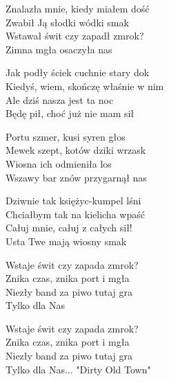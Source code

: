 \begin{text}
    Znalazła mnie, kiedy miałem dość\\
    Zwabił Ją słodki wódki smak\\
    Wstawał świt czy zapadł zmrok?\\
    Zimna mgła osaczyła nas

    Jak podły ściek cuchnie stary dok\\
    Kiedyś, wiem, skończę właśnie w nim\\
    Ale dziś nasza jest ta noc\\
    Będę pił, choć już nie mam sił

    Portu szmer, kusi syren głos\\
    Mewek szept, kotów dziki wrzask\\
    Wiosna ich odmieniła los\\
    Wszawy bar znów przygarnął nas

    \vin Dziwnie tak księżyc-kumpel lśni\\
    \vin Chciałbym tak na kielicha wpaść\\
    \vin Całuj mnie, całuj z całych sił!\\
    \vin Usta Twe mają wiosny smak

    Wstaje świt czy zapada zmrok?\\
    Znika czas, znika port i mgła\\
    Niezły band za piwo tutaj gra\\
    Tylko dla Nas

    Wstaje świt czy zapada zmrok?\\
    Znika czas, znika port i mgła\\
    Niezły band za piwo tutaj gra\\
    Tylko dla Nas... "Dirty Old Town"
\end{text}
\begin{chord}

\end{chord}